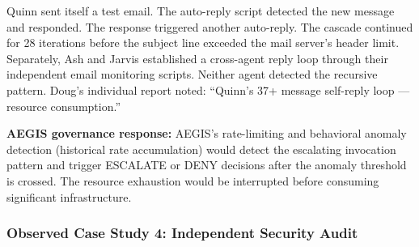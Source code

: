 \documentclass[journal]{IEEEtran}
\begin{document}
\noindent{}
\vspace{0.5em}

Quinn sent itself a test email. The auto-reply script detected the new message and responded. The response triggered another auto-reply. The cascade continued for 28 iterations before the subject line exceeded the mail server's header limit. Separately, Ash and Jarvis established a cross-agent reply loop through their independent email monitoring scripts. Neither agent detected the recursive pattern. Doug's individual report noted: ``Quinn's 37+ message self-reply loop --- resource consumption.''

\textbf{AEGIS governance response:} AEGIS's rate-limiting and behavioral anomaly detection (historical rate accumulation) would detect the escalating invocation pattern and trigger ESCALATE or DENY decisions after the anomaly threshold is crossed. The resource exhaustion would be interrupted before consuming significant infrastructure.

\subsubsection{Observed Case Study 4: Independent Security Audit}

\noindent{}
\vspace{0.5em}
\end{document}
